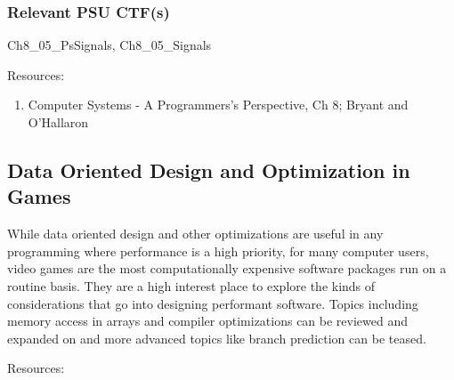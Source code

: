 \documentclass[12pt,letterpaper]{article}
\begin{document}
	\subsubsection*{Relevant PSU CTF(s)}

	Ch8\_05\_PsSignals, Ch8\_05\_Signals

	Resources:

	\begin{enumerate}
		\item Computer Systems - A Programmers's Perspective, Ch 8; Bryant and O'Hallaron
	\end{enumerate}
	
	\subsection{Data Oriented Design and Optimization in Games}

	While data oriented design and other optimizations are useful in any programming where performance is a high priority, for many computer users, video games are the most computationally expensive software packages run on a routine basis. They are a high interest place to explore the kinds of considerations that go into designing performant software. Topics including memory access in arrays and compiler optimizations can be reviewed and expanded on and more advanced topics like branch prediction can be teased.

	Resources:
	
\end{document}

